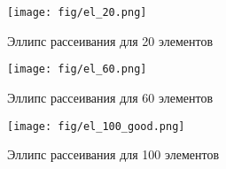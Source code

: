 \begin{figure}[H]
        \centering
        \texttt{[image: fig/el\_20.png]}
        \caption{Эллипс рассеивания для 20 элементов}
        \label{fig:enter-label}
\end{figure}

\begin{figure}[H]
        \centering
        \texttt{[image: fig/el\_60.png]}
        \caption{Эллипс рассеивания для 60 элементов}
        \label{fig:enter-label}
\end{figure}

\begin{figure}[H]
        \centering
        \texttt{[image: fig/el\_100\_good.png]}
        \caption{Эллипс рассеивания для 100 элементов}
        \label{fig:enter-label}
\end{figure}

